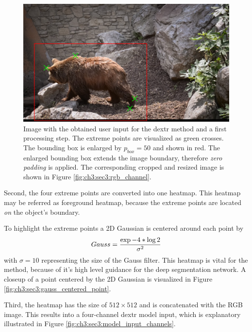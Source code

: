 \begin{figure}
	\includegraphics[width=\linewidth]{figures/chap33_bear_bbox.png}
	\caption[DEXTR User Interaction]{		
		Image with the obtained user input for the \gls{dextr} method and a first processing step.
		The extreme points are visualized as green crosses.
		The bounding box is enlarged by $p_{{box}} = 50$  and shown in red.
		The enlarged bounding box extends the image boundary, therefore \textit{zero padding} is applied.
		The corresponding cropped and resized image is shown in Figure \ref{fig:ch3:sec3:rgb_channel}.
	}
	\label{fig:ch3:sec3:user_interaction}
\end{figure}


Second, the four extreme points are converted into one heatmap.
This heatmap may be referred as foreground heatmap, because the extreme points are located \textit{on} the object's boundary.

To highlight the extreme points a 2D Gaussian is centered around each point by
\begin{equation} \label{equ:gauss}
	\centering
	Gauss = \frac{\exp{-4 * \log 2 }}{\sigma^{2}}
\end{equation}
with $\sigma = 10$ representing the size of the Gauss filter.
This heatmap is vital for the method, because of it's high level guidance for the deep segmentation network.
A closeup of a point centered by the 2D Gaussian is visualized in Figure \ref{fig:ch3:sec3:gauss_centered_point}.

Third, the heatmap has the size of $512 \times 512$  and is concatenated with the RGB image.
This results into a four-channel \gls{dextr} model input, which is explanatory illustrated in Figure \ref{fig:ch3:sec3:model_input_channels}.

